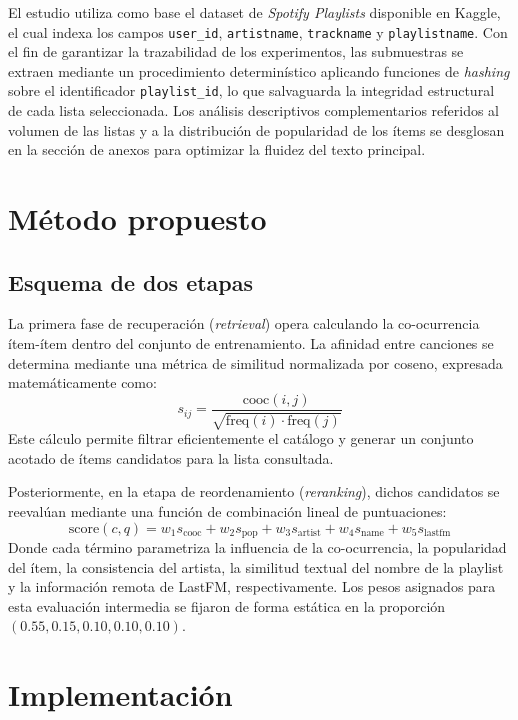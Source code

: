 \documentclass[10pt,letterpaper]{article}
\begin{document}
El estudio utiliza como base el dataset de \textit{Spotify Playlists} disponible en Kaggle, el cual indexa los campos \texttt{user\_id}, \texttt{artistname}, \texttt{trackname} y \texttt{playlistname}. Con el fin de garantizar la trazabilidad de los experimentos, las submuestras se extraen mediante un procedimiento determinístico aplicando funciones de \textit{hashing} sobre el identificador \texttt{playlist\_id}, lo que salvaguarda la integridad estructural de cada lista seleccionada. Los análisis descriptivos complementarios referidos al volumen de las listas y a la distribución de popularidad de los ítems se desglosan en la sección de anexos para optimizar la fluidez del texto principal.

\section{Método propuesto}

\subsection{Esquema de dos etapas}

La primera fase de recuperación (\textit{retrieval}) opera calculando la co-ocurrencia ítem-ítem dentro del conjunto de entrenamiento. La afinidad entre canciones se determina mediante una métrica de similitud normalizada por coseno, expresada matemáticamente como:
$$s_{ij}=\frac{\text{cooc}(i,j)}{\sqrt{\text{freq}(i)\cdot\text{freq}(j)}}$$
Este cálculo permite filtrar eficientemente el catálogo y generar un conjunto acotado de ítems candidatos para la lista consultada.

Posteriormente, en la etapa de reordenamiento (\textit{reranking}), dichos candidatos se reevalúan mediante una función de combinación lineal de puntuaciones:
$$\text{score}(c,q)=w_1 s_{\text{cooc}} + w_2 s_{\text{pop}} + w_3 s_{\text{artist}} + w_4 s_{\text{name}} + w_5 s_{\text{lastfm}}$$
Donde cada término parametriza la influencia de la co-ocurrencia, la popularidad del ítem, la consistencia del artista, la similitud textual del nombre de la playlist y la información remota de LastFM, respectivamente. Los pesos asignados para esta evaluación intermedia se fijaron de forma estática en la proporción $(0.55, 0.15, 0.10, 0.10, 0.10)$.

\section{Implementación}
\end{document}
